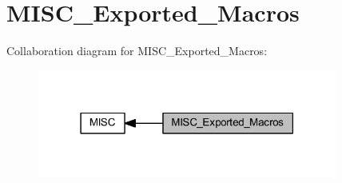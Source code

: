 \hypertarget{group___m_i_s_c___exported___macros}{}\section{M\+I\+S\+C\+\_\+\+Exported\+\_\+\+Macros}
\label{group___m_i_s_c___exported___macros}
Collaboration diagram for M\+I\+S\+C\+\_\+\+Exported\+\_\+\+Macros\+:
\nopagebreak
\begin{figure}[H]
\begin{center}
\leavevmode
\includegraphics[width=279pt]{group___m_i_s_c___exported___macros}
\end{center}
\end{figure}
